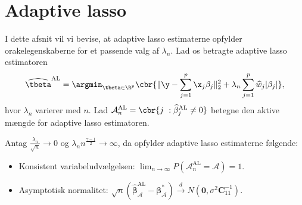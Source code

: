 \section{Adaptive lasso} \label{subsec:konsistentAL}
I dette afsnit vil vi bevise, at adaptive lasso estimaterne opfylder orakelegenskaberne for et passende valg af \(\lambda_n\). 
Lad os betragte adaptive lasso estimatoren
\begin{align*}
\widehat{\tbeta}^\text{AL} = \argmin_{\tbeta \in \R^p} \cbr{ \Vert \y - \sum_{j=1}^p \x_j \beta_j \Vert_2^2 + \lambda_n \sum_{j=1}^p \widehat{w}_j \vert \beta_j \vert},
\end{align*}
hvor \(\lambda_n\) varierer med \(n\).
Lad \(\mathcal{A}_n^\text{AL} = \cbr{j \ : \widehat{\beta}_j^{\text{AL}} \neq 0 }\) betegne den aktive mængde for adaptive lasso estimatoren.
%
\begin{thm}\label{thm:ALoracle}
Antag $\frac{\lambda_n}{\sqrt{n}} \rightarrow 0$ og $\lambda_n n^\frac{\gamma-1}{2} \rightarrow \infty$, da opfylder adaptive lasso estimaterne følgende:
\begin{itemize}
\item Konsistent variabeludvælgelsen: $\lim_{n \rightarrow \infty} P(\mathcal{A}_n^\text{AL}=\mathcal{A})=1$.
\item Asymptotisk normalitet: $\sqrt{n}\left( \widehat{\boldsymbol{\beta}}_\mathcal{A}^{\text{AL}}-\boldsymbol{\beta}_\mathcal{A}^* \right) \overset{d}{\rightarrow} N(\textbf{0},\sigma^2 \boldsymbol{C}_{11}^{-1}).$
\end{itemize} 
\end{thm}
%

